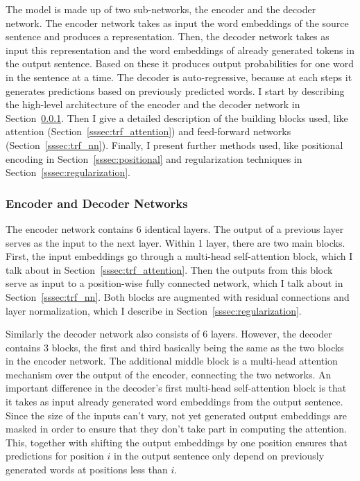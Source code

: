 \documentclass[12pt]{article}
\begin{document}
The model is made up of two sub-networks, the encoder and the decoder network. The encoder network takes as input the word embeddings of the source sentence and produces a representation. Then, the decoder network takes as input this representation and the word embeddings of already generated tokens in the output sentence. Based on these it produces output probabilities for one word in the sentence at a time. The decoder is auto-regressive, because at each steps it generates predictions based on previously predicted words. I start by describing the high-level architecture of the encoder and the decoder network in Section~\ref{sssec:encdec}. Then I give a detailed description of the building blocks used, like attention (Section~\ref{sssec:trf_attention}) and feed-forward networks (Section~\ref{sssec:trf_nn}). Finally, I present further methods used, like positional encoding in Section~\ref{sssec:positional} and regularization techniques in Section~\ref{sssec:regularization}.

\subsubsection{Encoder and Decoder Networks} \label{sssec:encdec}
The encoder network contains 6 identical layers. The output of a previous layer serves as the input to the next layer. Within 1 layer, there are two main blocks. First, the input embeddings go through a multi-head self-attention block, which I talk about in Section~\ref{sssec:trf_attention}. Then the outputs from this block serve as input to a position-wise fully connected network, which I talk about in Section~\ref{sssec:trf_nn}. Both blocks are augmented with residual connections and layer normalization, which I describe in Section~\ref{sssec:regularization}.

Similarly the decoder network also consists of 6 layers. However, the decoder contains 3 blocks, the first and third basically being the same as the two blocks in the encoder network. The additional middle block is a multi-head attention mechanism over the output of the encoder, connecting the two networks. An important difference in the decoder's first multi-head self-attention block is that it takes as input already generated word embeddings from the output sentence. Since the size of the inputs can't vary, not yet generated output embeddings are masked in order to ensure that they don't take part in computing the attention. This, together with shifting the output embeddings by one position ensures that predictions for position \(i\) in the output sentence only depend on previously generated words at positions less than \(i\).
\end{document}
